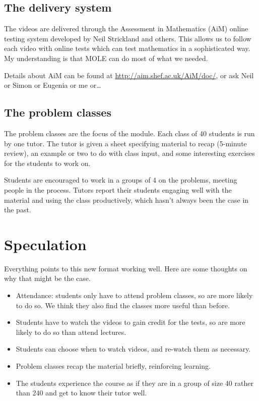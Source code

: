 \documentclass[12pt,envcountsect]{beamer}
\theoremstyle{plain}
\theoremstyle{definition}
\begin{document}
\subsection{The delivery system}

\begin{frame}
The videos are delivered through the Assessment in Mathematics (AiM) online testing system developed by Neil Strickland and others. \pause This allows us to follow each video with online tests which can test mathematics in a sophisticated way. \pause My understanding is that MOLE can do most of what we needed.\pause

Details about AiM can be found at \url{http://aim.shef.ac.uk/AiM/doc/}, or ask Neil or Simon or Eugenia or me or\ldots
\end{frame}



\subsection{The problem classes}

\begin{frame}
The problem classes are the focus of the module. \pause Each class of 40 students is run by one tutor. \pause The tutor is given a sheet specifying material to recap (5-minute review), \pause an example or two to do with class input, \pause and some interesting exercises for the students to work on. \pause

Students are encouraged to work in a groups of 4 on the problems, \pause meeting people in the process. \pause Tutors report their students engaging well with the material and using the class productively, \pause which hasn't always been the case in the past.
\end{frame}

\section{Speculation}

\begin{frame}
Everything points to this new format working well. \pause Here are some thoughts on why that might be the case.\pause
\begin{itemize}
\item Attendance: \pause students only have to attend problem classes, \pause so are more likely to do so. \pause We think they also find the classes more useful than before.\pause
\item Students have to watch the videos to gain credit for the tests, \pause so are more likely to do so than attend lectures.\pause
\item Students can choose when to watch videos, \pause and re-watch them as necessary.\pause
\item Problem classes recap the material briefly, reinforcing learning.\pause
\item The students experience the course as if they are in a group of size 40 rather than 240 \pause and get to know their tutor well.
\end{itemize}
\end{frame}
\end{document}

